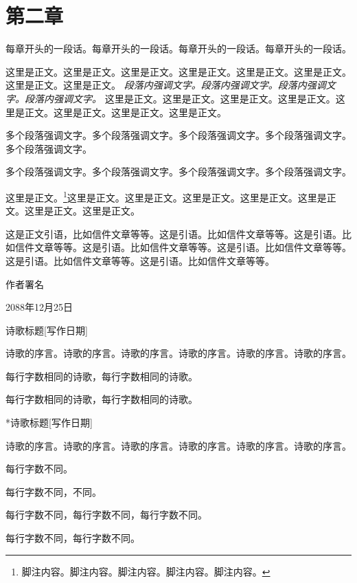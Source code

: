 \documentclass[../../dazhuan.tex]{subfiles}
\begin{document}
\chapter*{第二章}

\begin{pref}
	每章开头的一段话。每章开头的一段话。每章开头的一段话。每章开头的一段话。	
\end{pref}

这里是正文。这里是正文。这里是正文。这里是正文。这里是正文。这里是正文。这里是正文。这里是正文。
\emph{段落内强调文字。段落内强调文字。段落内强调文字。段落内强调文字。}
这里是正文。这里是正文。这里是正文。这里是正文。这里是正文。这里是正文。这里是正文。这里是正文。

\begin{xemph}
	多个段落强调文字。多个段落强调文字。多个段落强调文字。多个段落强调文字。多个段落强调文字。
	
	多个段落强调文字。多个段落强调文字。多个段落强调文字。多个段落强调文字。
\end{xemph}


这里是正文。\footnote{脚注内容。脚注内容。脚注内容。脚注内容。脚注内容。}这里是正文。这里是正文。这里是正文。这里是正文。这里是正文。这里是正文。这里是正文。

\begin{xquote}
	这是正文引语，比如信件文章等等。这是引语。比如信件文章等等。这是引语。比如信件文章等等。这是引语。比如信件文章等等。这是引语。比如信件文章等等。这是引语。比如信件文章等等。这是引语。比如信件文章等等。
\end{xquote}

\begin{sign}
	作者署名
	
	2088年12月25日
\end{sign}


\newpage
\begin{poem}{诗歌标题}[写作日期]
	\begin{xpref}
		诗歌的序言。诗歌的序言。诗歌的序言。诗歌的序言。诗歌的序言。诗歌的序言。
	\end{xpref}
	
	每行字数相同的诗歌，每行字数相同的诗歌。
	
	每行字数相同的诗歌，每行字数相同的诗歌。	
\end{poem}

\begin{poem}*{诗歌标题}[写作日期]
	\begin{xpref}
		诗歌的序言。诗歌的序言。诗歌的序言。诗歌的序言。诗歌的序言。诗歌的序言。
	\end{xpref}
	
	每行字数不同。
	
	每行字数不同，不同。
	
	每行字数不同，每行字数不同，每行字数不同。
	
	每行字数不同，每行字数不同。	
\end{poem}
\end{document}
